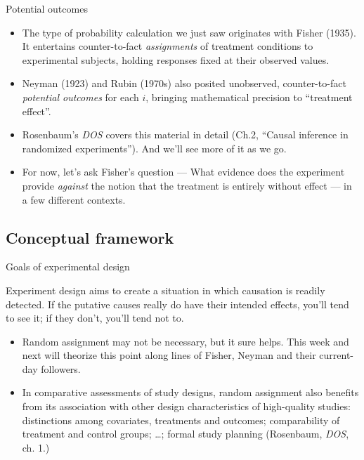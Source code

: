 \begin{frame}{Potential outcomes}
  
  \begin{itemize}[<+->]
  \item The type of probability calculation we just saw originates
    with Fisher (1935). It entertains counter-to-fact
    \textit{assignments} of treatment conditions to experimental
    subjects, holding responses fixed at their observed values.
  \item Neyman (1923) and Rubin (1970s) also posited
    unobserved, counter-to-fact \textit{potential outcomes} for each
    $i$, bringing mathematical precision to ``treatment effect''.
   \item Rosenbaum's \textit{DOS} covers this material in detail
       (Ch.2, ``Causal inference in randomized experiments''). And we'll
       see more of it as we go.
   \item For now, let's ask Fisher's question --- What evidence does
     the experiment provide \textit{against} the notion that the
     treatment is entirely without effect --- in a few different contexts.
  \end{itemize}

\end{frame}


\subsection{Conceptual framework}
\begin{frame}{Goals of experimental design}

Experiment design aims to create a situation in which causation is
readily detected. If the putative causes
really do have their intended effects, you'll tend to see it; if they
don't, you'll tend not to.
\pause

\begin{itemize}[<+->]
\item \textrm{Random
    assignment} may not be necessary, but it sure helps.
  This week and next will theorize this point along lines
  of Fisher, Neyman and their current-day followers.
\item In comparative assessments of study designs, random assignment also benefits
  from its association with other design characteristics of
  high-quality studies:  distinctions among covariates, treatments and
  outcomes; comparability of treatment and control groups; \ldots;
  formal study planning (Rosenbaum, \textit{DOS}, ch. 1.)
\end{itemize}

\end{frame}

